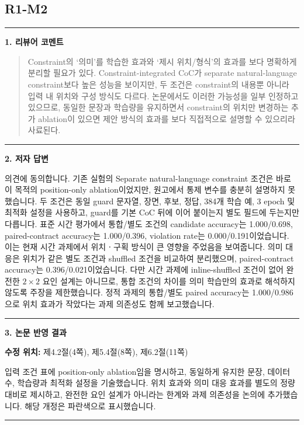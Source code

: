 \documentclass[11pt]{article}
\newcommand{\fieldheading}[2]{%
  \par\medskip\noindent
  {\color{#1}\rule{3pt}{1.25em}}\hspace{0.55em}\textbf{#2}\par\smallskip}
\newenvironment{reviewitem}[1]
  {\subsection*{#1}}
  {\par\medskip\hrule\bigskip}
\newenvironment{reviewercomment}
  {\fieldheading{reviewercolor}{1. 리뷰어 코멘트}%
   \begin{quote}}
  {\end{quote}}
\newenvironment{authorresponse}
  {\fieldheading{responsecolor}{2. 저자 답변}}
  {\par}
\newenvironment{manuscriptrevision}[1]
  {\fieldheading{revisioncolor}{3. 논문 반영 결과}%
   \textbf{수정 위치:} #1\par\smallskip}
  {\par}
\begin{document}
\begin{reviewitem}{R1-M2}
  \begin{reviewercomment}
    Constraint의 ‘의미’를 학습한 효과와 ‘제시 위치/형식’의 효과를 보다 명확하게
    분리할 필요가 있다. Constraint-integrated CoC가 separate natural-language
    constraint보다 높은 성능을 보이지만, 두 조건은 constraint의 내용뿐 아니라
    입력 내 위치와 구성 방식도 다르다. 논문에서도 이러한 가능성을 일부 인정하고
    있으므로, 동일한 문장과 학습량을 유지하면서 constraint의 위치만 변경하는
    추가 ablation이 있으면 제안 방식의 효과를 보다 직접적으로 설명할 수 있으리라
    사료된다.
  \end{reviewercomment}

  \begin{authorresponse}
    의견에 동의합니다. 기존 실험의 Separate natural-language constraint 조건은
    바로 이 목적의 position-only ablation이었지만, 원고에서 통제 변수를 충분히
    설명하지 못했습니다. 두 조건은 동일 guard 문자열, 장면, 후보, 정답, 384개
    학습 예, 3 epoch 및 최적화 설정을 사용하고, guard를 기본 CoC 뒤에 이어
    붙이는지 별도 필드에 두는지만 다릅니다. 표준 시간 평가에서 통합/별도 조건의
    candidate accuracy는 1.000/0.698, paired-contract accuracy는 1.000/0.396,
    violation rate는 0.000/0.191이었습니다. 이는 현재 시간 과제에서 위치ㆍ구획
    방식이 큰 영향을 주었음을 보여줍니다. 의미 대응은 위치가 같은 별도 조건과
    shuffled 조건을 비교하여 분리했으며, paired-contract accuracy는
    0.396/0.021이었습니다. 다만 시간 과제에 inline-shuffled 조건이 없어 완전한
    $2\times2$ 요인 설계는 아니므로, 통합 조건의 차이를 의미 학습만의 효과로
    해석하지 않도록 주장을 제한했습니다. 정적 과제의 통합/별도 paired accuracy는
    1.000/0.986으로 위치 효과가 작았다는 과제 의존성도 함께 보고했습니다.
  \end{authorresponse}

  \begin{manuscriptrevision}{제4.2절(4쪽), 제5.4절(8쪽), 제6.2절(11쪽)}
    입력 조건 표에 position-only ablation임을 명시하고, 동일하게 유지한 문장,
    데이터 수, 학습량과 최적화 설정을 기술했습니다. 위치 효과와 의미 대응 효과를
    별도의 정량 대비로 제시하고, 완전한 요인 설계가 아니라는 한계와 과제 의존성을
    논의에 추가했습니다. 해당 개정은 파란색으로 표시했습니다.
  \end{manuscriptrevision}
\end{reviewitem}
\end{document}
